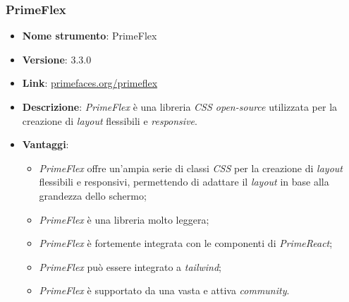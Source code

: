 \subsubsection{PrimeFlex}
\begin{itemize}
      \item \textbf{Nome strumento}: PrimeFlex
      \item \textbf{Versione}: 3.3.0
      \item \textbf{Link}: \href{https://primereact.org/}{primefaces.org/primeflex}
      \item \textbf{Descrizione}: \textit{PrimeFlex} è una libreria \textit{CSS open-source} utilizzata per la creazione di \textit{layout} flessibili e \textit{\gls{responsive}\glox}.
      \item \textbf{Vantaggi}:
            \begin{itemize}
                  \item \textit{PrimeFlex} offre un'ampia serie di classi \textit{CSS} per la creazione di \textit{layout} flessibili e responsivi, permettendo di adattare il \textit{layout}
                        in base alla grandezza dello schermo;
                  \item \textit{PrimeFlex} è una libreria molto leggera;
                  \item \textit{PrimeFlex} è fortemente integrata con le componenti di \textit{PrimeReact};
                  \item \textit{PrimeFlex} può essere integrato a \textit{tailwind};
                  \item \textit{PrimeFlex} è supportato da una vasta e attiva \textit{community}.
            \end{itemize}
\end{itemize}

